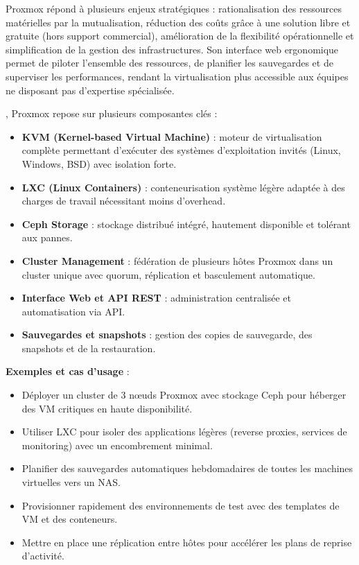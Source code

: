  Proxmox répond à plusieurs enjeux stratégiques  : rationalisation des ressources matérielles par la mutualisation, réduction des coûts grâce à une solution libre et gratuite (hors support commercial), amélioration de la flexibilité opérationnelle et simplification de la gestion des infrastructures. Son interface web ergonomique permet de piloter l’ensemble des ressources, de planifier les sauvegardes et de superviser les performances, rendant la virtualisation plus accessible aux équipes ne disposant pas d’expertise spécialisée.

, Proxmox repose sur plusieurs composantes clés :
\begin{itemize}
	\item \textbf{KVM (Kernel-based Virtual Machine)}  : moteur de virtualisation complète permettant d’exécuter des systèmes d’exploitation invités (Linux, Windows, BSD) avec isolation forte.
	\item \textbf{LXC (Linux Containers)}  : conteneurisation système légère adaptée à des charges de travail nécessitant moins d’overhead.
	\item \textbf{Ceph Storage}  : stockage distribué intégré, hautement disponible et tolérant aux pannes.
	\item \textbf{Cluster Management}  : fédération de plusieurs hôtes Proxmox dans un cluster unique avec quorum, réplication et basculement automatique.
	\item \textbf{Interface Web et API REST}  : administration centralisée et automatisation via API.
	\item \textbf{Sauvegardes et snapshots}  : gestion des copies de sauvegarde, des snapshots et de la restauration.
\end{itemize}

\textbf{Exemples et cas d’usage} :
\begin{itemize}
	\item Déployer un cluster de 3 nœuds Proxmox avec stockage Ceph pour héberger des VM critiques en haute disponibilité.
	\item Utiliser LXC pour isoler des applications légères (reverse proxies, services de monitoring) avec un encombrement minimal.
	\item Planifier des sauvegardes automatiques hebdomadaires de toutes les machines virtuelles vers un NAS.
	\item Provisionner rapidement des environnements de test avec des templates de VM et des conteneurs.
	\item Mettre en place une réplication entre hôtes pour accélérer les plans de reprise d’activité.
\end{itemize}

